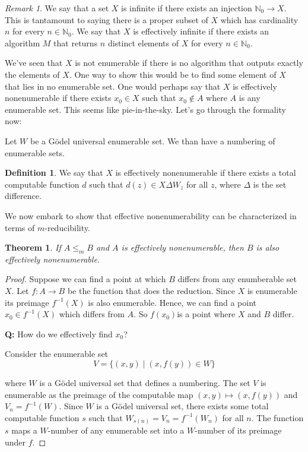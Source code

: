 \documentclass[10pt, letterpaper]{article}
\newcommand{\N}{\mathbb{N}}
\newtheorem{thm}{Theorem}
\theoremstyle{remark}
\newtheorem{rem}{Remark}
\theoremstyle{definition}
\newtheorem{defn}{Definition}
\begin{document}
    \begin{rem}
        We say that a set $X$ is infinite if there exists an injection $\N_0 \rightarrow X$. This is tantamount to saying there is a proper
        subset of $X$ which has cardinality $n$ for every $n \in \N_0$. We say that $X$ is effectively infinite if there exists an algorithm 
        $M$ that returns $n$ distinct elements of $X$ for every $n \in \N_0$.
    \end{rem}

    We've seen that $X$ is not enumerable if there is no algorithm that outputs exactly the elements of $X$. One way to show this  would be to find 
    some element of $X$ that lies in no enumerable set. One would perhaps say that $X$ is effectively nonenumerable if there exists $x_0 \in X$ such
    that $x_0 \notin A$ where $A$ is any enumerable set. This seems like pie-in-the-sky. Let's go through the formality now:

    Let $W$ be a G\"{o}del universal enumerable set. We than have a numbering of enumerable sets.

    \begin{defn}
        We say that $X$ is effectively nonenumerable if there exists a total computable function $d$ such that $d(z) \in X \Delta W_z$ for all $z$,
        where $\Delta$ is the set difference.
    \end{defn}

    We now embark to show that effective nonenumerability can be characterized in terms of $m$-reducibility.

    \begin{thm}
        If $A \leq_m B$ and $A$ is effectively nonenumerable, then $B$ is also effectively nonenumerable.
    \end{thm}

    \begin{proof}
        Suppose we can find a point at which $B$ differs from any enumberable set $X$. Let $f:A \rightarrow B$ be the function that does the reduction.
        Since $X$ is enumerable its preimage $f^{-1}(X)$ is also enumerable. Hence, we can find a point $x_0 \in f^{-1}(X)$ which differs from $A$. So 
        $f(x_0)$is a point where $X$ and $B$ differ. 

        \textbf{Q:} How do we effectively find $x_0$?

        Consider the enumerable set 
        \[
            V = \{(x,y) \mid (x,f(y)) \in W\}
        \]

        where $W$ is a G\"{o}del universal set that defines a numbering. The set $V$ is enumerable as the preimage of the computable map 
        $(x,y) \mapsto (x,f(y))$ and $V_n = f^{-1}(W)$. Since $W$ is a G\"{o}del universal set, there exists some total computable function 
        $s$ such that $W_{s(n)} = V_n = f^{-1}(W_n)$ for all $n$. The function $s$ maps a $W$-number of any enumerable set into a $W$-number 
        of its preimage under $f$.
    \end{proof}
\end{document}
